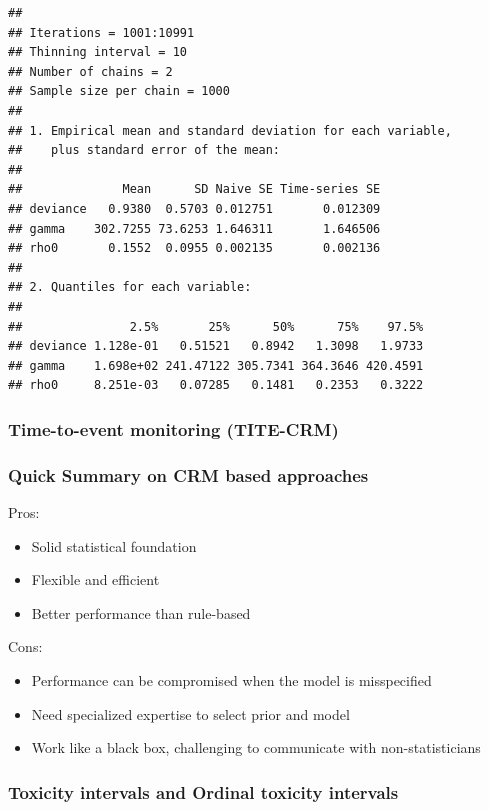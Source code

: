 \documentclass[
]{article}
\providecommand{\tightlist}{%
  \setlength{\itemsep}{0pt}\setlength{\parskip}{0pt}}
\begin{document}
\begin{verbatim}
## 
## Iterations = 1001:10991
## Thinning interval = 10 
## Number of chains = 2 
## Sample size per chain = 1000 
## 
## 1. Empirical mean and standard deviation for each variable,
##    plus standard error of the mean:
## 
##              Mean      SD Naive SE Time-series SE
## deviance   0.9380  0.5703 0.012751       0.012309
## gamma    302.7255 73.6253 1.646311       1.646506
## rho0       0.1552  0.0955 0.002135       0.002136
## 
## 2. Quantiles for each variable:
## 
##               2.5%       25%      50%      75%    97.5%
## deviance 1.128e-01   0.51521   0.8942   1.3098   1.9733
## gamma    1.698e+02 241.47122 305.7341 364.3646 420.4591
## rho0     8.251e-03   0.07285   0.1481   0.2353   0.3222
\end{verbatim}

\hypertarget{time-to-event-monitoring-tite-crm}{%
\subsubsection{Time-to-event monitoring
(TITE-CRM)}\label{time-to-event-monitoring-tite-crm}}

\hypertarget{quick-summary-on-crm-based-approaches}{%
\subsubsection{Quick Summary on CRM based
approaches}\label{quick-summary-on-crm-based-approaches}}

Pros:

\begin{itemize}
\tightlist
\item
  Solid statistical foundation
\item
  Flexible and efficient
\item
  Better performance than rule-based
\end{itemize}

Cons:

\begin{itemize}
\tightlist
\item
  Performance can be compromised when the model is misspecified
\item
  Need specialized expertise to select prior and model
\item
  Work like a black box, challenging to communicate with
  non-statisticians
\end{itemize}

\hypertarget{toxicity-intervals-and-ordinal-toxicity-intervals}{%
\subsubsection{Toxicity intervals and Ordinal toxicity
intervals}\label{toxicity-intervals-and-ordinal-toxicity-intervals}}
\end{document}
